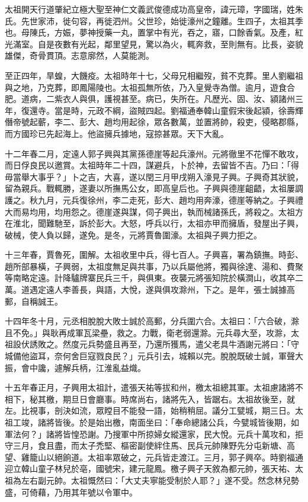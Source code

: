 
\begin{pinyinscope}
太祖開天行道肇紀立極大聖至神仁文義武俊德成功高皇帝，諱元璋，字國瑞，姓朱氏。先世家沛，徙句容，再徙泗州。父世珍，始徙濠州之鐘離。生四子，太祖其季也。母陳氏，方娠，夢神授藥一丸，置掌中有光，吞之，寤，口餘香氣。及產，紅光滿室。自是夜數有光起，鄰里望見，驚以為火，輒奔救，至則無有。比長，姿貌雄傑，奇骨貫頂。志意廓然，人莫能測。

至正四年，旱蝗，大饑疫。太祖時年十七，父母兄相繼歿，貧不克葬。里人劉繼祖與之地，乃克葬，即鳳陽陵也。太祖孤無所依，乃入皇覺寺為僧。逾月，遊食合肥。道病，二紫衣人與俱，護視甚至。病已，失所在。凡歷光、固、汝、潁諸州三年，復還寺。當是時，元政不綱，盜賊四起。劉福通奉韓山童假宋後起潁，徐壽輝僭帝號起蘄，李二、彭大、趙均用起徐，眾各數萬，並置將帥，殺吏，侵略郡縣，而方國珍已先起海上。他盜擁兵據地，寇掠甚眾。天下大亂。

十二年春二月，定遠人郭子興與其黨孫德崖等起兵濠州。元將徹里不花憚不敢攻，而日俘良民以邀賞。太祖時年二十四，謀避兵，卜於神，去留皆不吉。乃曰：「得毋當舉大事乎？」卜之吉，大喜，遂以閏三月甲戌朔入濠見子興。子興奇其狀貌，留為親兵。戰輒勝，遂妻以所撫馬公女，即高皇后也。子興與德崖齟齬，太祖屢調護之。秋九月，元兵復徐州，李二走死，彭大、趙均用奔濠，德崖等納之。子興禮大而易均用，均用怨之。德崖遂與謀，伺子興出，執而械諸孫氏，將殺之。太祖方在淮北，聞難馳至，訴於彭大。大怒，呼兵以行，太祖亦甲而擁盾，發屋出子興，破械，使人負以歸，遂免。是冬，元將賈魯圍濠。太祖與子興力拒之。

十三年春，賈魯死，圍解。太祖收里中兵，得七百人。子興喜，署為鎮撫。時彭、趙所部暴橫，子興弱，太祖度無足與共事，乃以兵屬他將，獨與徐達、湯和、費聚等南略定遠。計降驢牌寨民兵三千，與俱東。夜襲元將張知院於橫澗山，收其卒二萬。道遇定遠人李善長，與語，大悅，遂與俱攻滁州，下之。是年，張士誠據高郵，自稱誠王。

十四年冬十月，元丞相脫脫大敗士誠於高郵，分兵圍六合。太祖曰：「六合破，滁且不免。」與耿再成軍瓦梁壘，救之。力戰，衛老弱還滁。元兵尋大至，攻滁，太祖設伏誘敗之。然度元兵勢盛且再至，乃還所獲馬，遣父老具牛酒謝元將曰：「守城備他盜耳，奈何舍巨寇戮良民？」元兵引去，城賴以完。脫脫既破士誠，軍聲大振，會中讒，遽解兵柄，江淮亂益熾。

十五年春正月，子興用太祖計，遣張天祐等拔和州，檄太祖總其軍。太祖慮諸將不相下，秘其檄，期旦日會廳事。時席尚右，諸將先入，皆踞右。太祖故後至，就左。比視事，剖決如流，眾瞠目不能發一語，始稍稍屈。議分工甓城，期三日。太祖工竣，諸將皆後。於是始出檄，南面坐曰：「奉命總諸公兵，今甓城皆後期，如軍法何？」諸將皆惶恐謝。乃搜軍中所掠婦女縱還家，民大悅。元兵十萬攻和，拒守三月，食且盡，而太子禿堅、樞密副使絆住馬、民兵元帥陳野先分屯新塘、高望、雞籠山以絕餉道。太祖率眾破之，元兵皆走渡江。三月，郭子興卒。時劉福通迎立韓山童子林兒於亳，國號宋，建元龍鳳。檄子興子天敘為都元帥，張天祐、太祖為左右副元帥。太祖慨然曰：「大丈夫寧能受制於人耶？」遂不受。然念林兒勢盛，可倚藉，乃用其年號以令軍中。


\end{pinyinscope}
